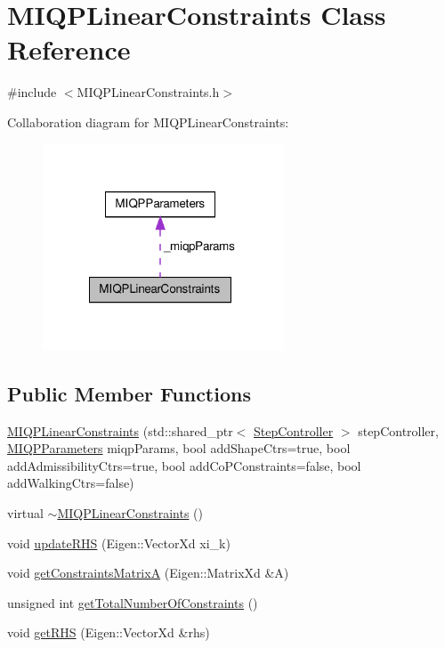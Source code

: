 \hypertarget{classMIQPLinearConstraints}{\section{\-M\-I\-Q\-P\-Linear\-Constraints \-Class \-Reference}
\label{classMIQPLinearConstraints}
}


{\ttfamily \#include $<$\-M\-I\-Q\-P\-Linear\-Constraints.\-h$>$}



\-Collaboration diagram for \-M\-I\-Q\-P\-Linear\-Constraints\-:
\nopagebreak
\begin{figure}[H]
\begin{center}
\leavevmode
\includegraphics[width=203pt]{classMIQPLinearConstraints__coll__graph}
\end{center}
\end{figure}
\subsection*{\-Public \-Member \-Functions}
\begin{DoxyCompactItemize}
\item 
\hyperlink{classMIQPLinearConstraints_aaa55e8fc7fac6499f60c40e13b0d6605}{\-M\-I\-Q\-P\-Linear\-Constraints} (std\-::shared\-\_\-ptr$<$ \hyperlink{classStepController}{\-Step\-Controller} $>$ step\-Controller, \hyperlink{structMIQPParameters}{\-M\-I\-Q\-P\-Parameters} miqp\-Params, bool add\-Shape\-Ctrs=true, bool add\-Admissibility\-Ctrs=true, bool add\-Co\-P\-Constraints=false, bool add\-Walking\-Ctrs=false)
\item 
virtual \hyperlink{classMIQPLinearConstraints_a1539d3c8eb2af42daa9bb17dd0f44bd2}{$\sim$\-M\-I\-Q\-P\-Linear\-Constraints} ()
\item 
void \hyperlink{classMIQPLinearConstraints_aad3232078ef93e2105a1c619c510f16a}{update\-R\-H\-S} (\-Eigen\-::\-Vector\-Xd xi\-\_\-k)
\item 
void \hyperlink{classMIQPLinearConstraints_ab556e990dcc0b1fcd152f41a8c00e1f6}{get\-Constraints\-Matrix\-A} (\-Eigen\-::\-Matrix\-Xd \&\-A)
\item 
unsigned int \hyperlink{classMIQPLinearConstraints_a656681ab464709b025e4522df3458fa1}{get\-Total\-Number\-Of\-Constraints} ()
\item 
void \hyperlink{classMIQPLinearConstraints_abf2bd3e8f0dfa5b919efa1b90b56232a}{get\-R\-H\-S} (\-Eigen\-::\-Vector\-Xd \&rhs)
\end{DoxyCompactItemize}
